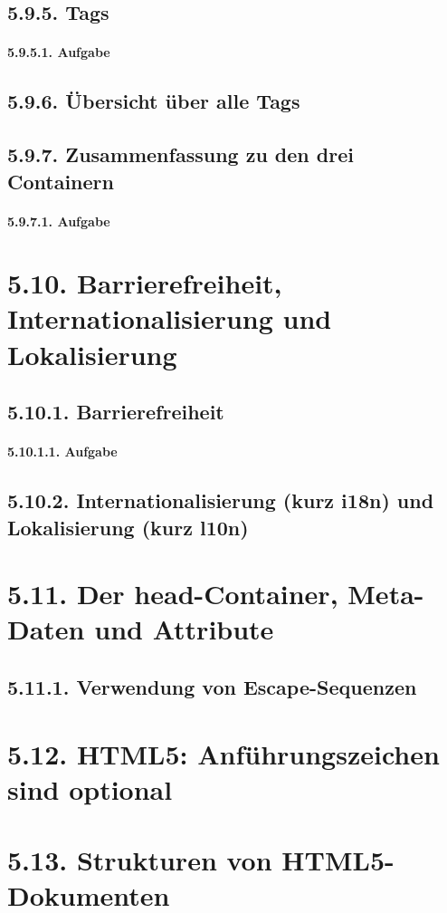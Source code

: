 \subsection{5.9.5.	Tags}
\paragraph{5.9.5.1.	Aufgabe}
\subsection{5.9.6.	Übersicht über alle Tags}
\subsection{5.9.7.	Zusammenfassung zu den drei Containern}
\paragraph{5.9.7.1.	Aufgabe}
\section{5.10.	Barrierefreiheit, Internationalisierung und Lokalisierung}
\subsection{5.10.1.	Barrierefreiheit}
\paragraph{5.10.1.1.	Aufgabe}
\subsection{5.10.2.	Internationalisierung (kurz i18n) und Lokalisierung (kurz l10n)}
\section{5.11.	Der head-Container, Meta-Daten und Attribute}
\subsection{5.11.1.	Verwendung von Escape-Sequenzen}
\section{5.12.	HTML5: Anführungszeichen sind optional}
\section{5.13.	Strukturen von HTML5-Dokumenten}
